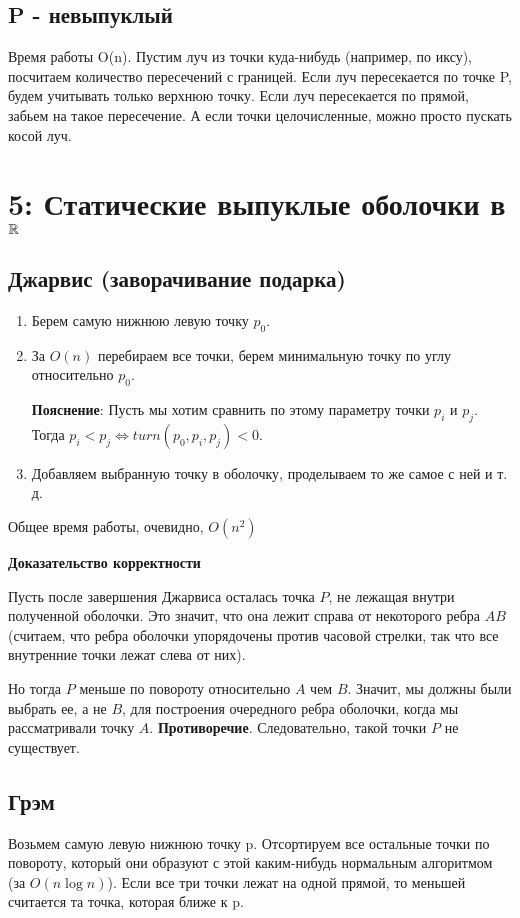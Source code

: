 \documentclass[11pt]{article}
\begin{document}
\subsection{P - невыпуклый}
\label{sec:orgheadline20}
Время работы O(n). Пустим луч из точки куда-нибудь (например, по
иксу), посчитаем количество пересечений с границей.  Если луч
пересекается по точке P, будем учитывать только верхнюю точку. Если
луч пересекается по прямой, забьем на такое пересечение. А если
точки целочисленные, можно просто пускать косой луч.

\section{{\bfseries{}} 5:  Статические выпуклые оболочки в \(\mathbb{R}\)}
\label{sec:orgheadline29}
\subsection{{\bfseries{}} Джарвис (заворачивание подарка)}
\label{sec:orgheadline22}
\begin{enumerate}
\item Берем самую нижнюю левую точку \(p_0\).
\item За \(O(n)\) перебираем все точки, берем минимальную точку по углу относительно \(p_0\).

\textbf{Пояснение}: Пусть мы хотим сравнить по этому параметру точки \(p_i\) и \(p_j\).
Тогда \(p_i < p_j \Leftrightarrow turn(p_0, p_i, p_j) < 0\).
\item Добавляем выбранную точку в оболочку, проделываем то же самое с ней и т. д.
\end{enumerate}

Общее время работы, очевидно, \(O(n^2)\)

\textbf{Доказательство корректности}

Пусть после завершения Джарвиса осталась точка \(P\), не лежащая внутри
полученной оболочки. Это значит, что она лежит справа от некоторого ребра \(AB\)
(считаем, что ребра оболочки упорядочены против часовой стрелки, так что все внутренние
точки лежат слева от них).

Но тогда \(P\) меньше по повороту относительно \(A\) чем \(B\).
Значит, мы должны были выбрать ее, а не \(B\), для построения очередного ребра оболочки,
когда мы рассматривали точку \(A\). \textbf{Противоречие}. Следовательно, такой точки \(P\) не существует.
\subsection{{\bfseries{}} Грэм}
\label{sec:orgheadline23}
Возьмем самую левую нижнюю точку p. Отсортируем все остальные точки по повороту,
который они образуют с этой каким-нибудь нормальным алгоритмом (за \(O(n \log n)\)).
Если все три точки лежат на одной прямой, то меньшей считается та точка, которая ближе к p.
\end{document}
